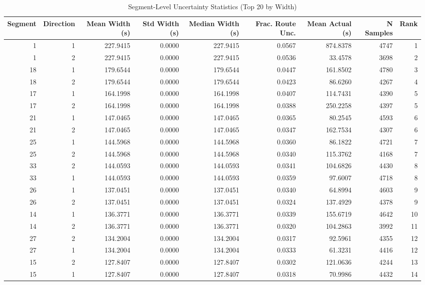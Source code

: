 \begin{table}
\caption{Segment-Level Uncertainty Statistics (Top 20 by Width)}
\label{tab:t62_segment_uncertainty}
\begin{tabular}{rrrrrrrrr}
\toprule
Segment & Direction & Mean Width (s) & Std Width (s) & Median Width (s) & Frac. Route Unc. & Mean Actual (s) & N Samples & Rank \\
\midrule
1 & 1 & 227.9415 & 0.0000 & 227.9415 & 0.0567 & 874.8378 & 4747 & 1 \\
1 & 2 & 227.9415 & 0.0000 & 227.9415 & 0.0536 & 33.4578 & 3698 & 2 \\
18 & 1 & 179.6544 & 0.0000 & 179.6544 & 0.0447 & 161.8502 & 4780 & 3 \\
18 & 2 & 179.6544 & 0.0000 & 179.6544 & 0.0423 & 86.6260 & 4267 & 4 \\
17 & 1 & 164.1998 & 0.0000 & 164.1998 & 0.0407 & 114.7431 & 4390 & 5 \\
17 & 2 & 164.1998 & 0.0000 & 164.1998 & 0.0388 & 250.2258 & 4397 & 5 \\
21 & 1 & 147.0465 & 0.0000 & 147.0465 & 0.0365 & 80.2545 & 4593 & 6 \\
21 & 2 & 147.0465 & 0.0000 & 147.0465 & 0.0347 & 162.7534 & 4307 & 6 \\
25 & 1 & 144.5968 & 0.0000 & 144.5968 & 0.0360 & 86.1822 & 4721 & 7 \\
25 & 2 & 144.5968 & 0.0000 & 144.5968 & 0.0340 & 115.3762 & 4168 & 7 \\
33 & 2 & 144.0593 & 0.0000 & 144.0593 & 0.0341 & 104.6826 & 4430 & 8 \\
33 & 1 & 144.0593 & 0.0000 & 144.0593 & 0.0359 & 97.6007 & 4718 & 8 \\
26 & 1 & 137.0451 & 0.0000 & 137.0451 & 0.0340 & 64.8994 & 4603 & 9 \\
26 & 2 & 137.0451 & 0.0000 & 137.0451 & 0.0324 & 137.4929 & 4378 & 9 \\
14 & 1 & 136.3771 & 0.0000 & 136.3771 & 0.0339 & 155.6719 & 4642 & 10 \\
14 & 2 & 136.3771 & 0.0000 & 136.3771 & 0.0320 & 104.2863 & 3992 & 11 \\
27 & 2 & 134.2004 & 0.0000 & 134.2004 & 0.0317 & 92.5961 & 4355 & 12 \\
27 & 1 & 134.2004 & 0.0000 & 134.2004 & 0.0333 & 61.3231 & 4416 & 12 \\
15 & 2 & 127.8407 & 0.0000 & 127.8407 & 0.0302 & 121.0636 & 4244 & 13 \\
15 & 1 & 127.8407 & 0.0000 & 127.8407 & 0.0318 & 70.9986 & 4432 & 14 \\
\bottomrule
\end{tabular}
\end{table}




